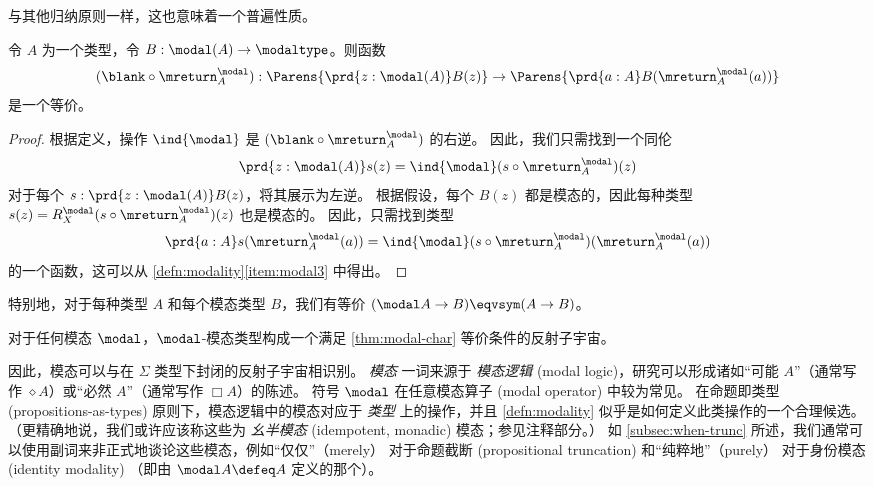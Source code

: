 %
与其他归纳原则一样，这也意味着一个普遍性质。

\begin{thm}\label{prop:lv_n_deptype_sec_equiv_by_precomp}
令 $A$ 为一个类型，令 $B:\modal(A)\to\modaltype$。则函数
\begin{equation*}
(\blank\circ \mreturn^\modal_A) : \Parens{\prd{z:\modal(A)}B(z)} \to \Parens{\prd{a:A}B(\mreturn^\modal_A(a))}
\end{equation*}
是一个等价。
\end{thm}
\begin{proof}
    根据定义，操作 $\ind{\modal}$ 是 $(\blank\circ \mreturn^\modal_A)$ 的右逆。
    因此，我们只需找到一个同伦
    \begin{equation*}
        \prd{z:\modal(A)}s(z)= \ind{\modal}(s\circ \mreturn^\modal_A)(z)
    \end{equation*}
    对于每个 $s:\prd{z:\modal(A)}B(z)$，将其展示为左逆。
    根据假设，每个 $B(z)$ 都是模态的，因此每种类型 $s(z)= R^\modal_X(s\circ \mreturn^\modal_A)(z)$ 也是模态的。
    因此，只需找到类型
    \begin{equation*}
        \prd{a:A}s(\mreturn^\modal_A(a))= \ind{\modal}(s\circ \mreturn^\modal_A)(\mreturn^\modal_A(a))
    \end{equation*}
    的一个函数，这可以从 \cref{defn:modality}\ref{item:modal3} 中得出。
\end{proof}

特别地，对于每种类型 $A$ 和每个模态类型 $B$，我们有等价 $(\modal A\to B)\eqvsym (A\to B)$。

\begin{cor}
    对于任何模态 $\modal$，$\modal$-模态类型构成一个满足 \cref{thm:modal-char} 等价条件的反射子宇宙。
\end{cor}

因此，模态可以与在 $\Sigma$ 类型下封闭的反射子宇宙相识别。
\emph{模态} 一词来源于 \emph{模态逻辑} (modal logic)，研究可以形成诸如“可能 $A$”（通常写作 $\diamond A$）或“必然 $A$”（通常写作 $\Box A$）的陈述。
符号 $\modal$ 在任意模态算子 (modal operator) 中较为常见。%
在命题即类型 (propositions-as-types) 原则下，模态逻辑中的模态对应于 \emph{类型} 上的操作，并且 \cref{defn:modality} 似乎是如何定义此类操作的一个合理候选。
（更精确地说，我们或许应该称这些为 \emph{幺半模态} (idempotent, monadic) 模态；参见注释部分。）
%
如 \cref{subsec:when-trunc} 所述，我们通常可以使用副词来非正式地谈论这些模态，例如“仅仅”（merely） 对于命题截断 (propositional truncation) 和“纯粹地”（purely） 对于身份模态 (identity modality)
%
%
（即由 $\modal A \defeq A$ 定义的那个）。

